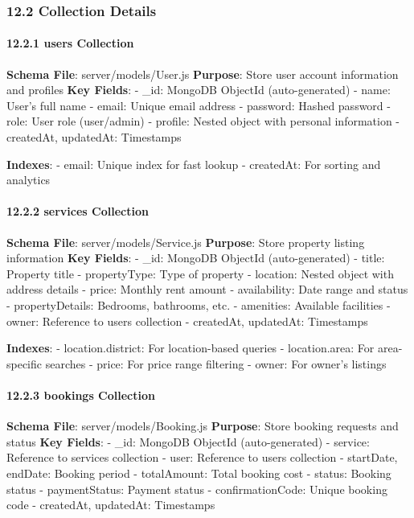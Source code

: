 \documentclass[12pt,a4paper]{article}
\begin{document}
\hypertarget{collection-details}{%
\subsubsection{12.2 Collection Details}\label{collection-details}}

\hypertarget{users-collection}{%
\paragraph{12.2.1 users Collection}\label{users-collection}}

\textbf{Schema File}: server/models/User.js \textbf{Purpose}: Store user
account information and profiles \textbf{Key Fields}: - \_id: MongoDB
ObjectId (auto-generated) - name: User's full name - email: Unique email
address - password: Hashed password - role: User role (user/admin) -
profile: Nested object with personal information - createdAt, updatedAt:
Timestamps

\textbf{Indexes}: - email: Unique index for fast lookup - createdAt: For
sorting and analytics

\hypertarget{services-collection}{%
\paragraph{12.2.2 services Collection}\label{services-collection}}

\textbf{Schema File}: server/models/Service.js \textbf{Purpose}: Store
property listing information \textbf{Key Fields}: - \_id: MongoDB
ObjectId (auto-generated) - title: Property title - propertyType: Type
of property - location: Nested object with address details - price:
Monthly rent amount - availability: Date range and status -
propertyDetails: Bedrooms, bathrooms, etc. - amenities: Available
facilities - owner: Reference to users collection - createdAt,
updatedAt: Timestamps

\textbf{Indexes}: - location.district: For location-based queries -
location.area: For area-specific searches - price: For price range
filtering - owner: For owner's listings

\hypertarget{bookings-collection}{%
\paragraph{12.2.3 bookings Collection}\label{bookings-collection}}

\textbf{Schema File}: server/models/Booking.js \textbf{Purpose}: Store
booking requests and status \textbf{Key Fields}: - \_id: MongoDB
ObjectId (auto-generated) - service: Reference to services collection -
user: Reference to users collection - startDate, endDate: Booking period
- totalAmount: Total booking cost - status: Booking status -
paymentStatus: Payment status - confirmationCode: Unique booking code -
createdAt, updatedAt: Timestamps
\end{document}
